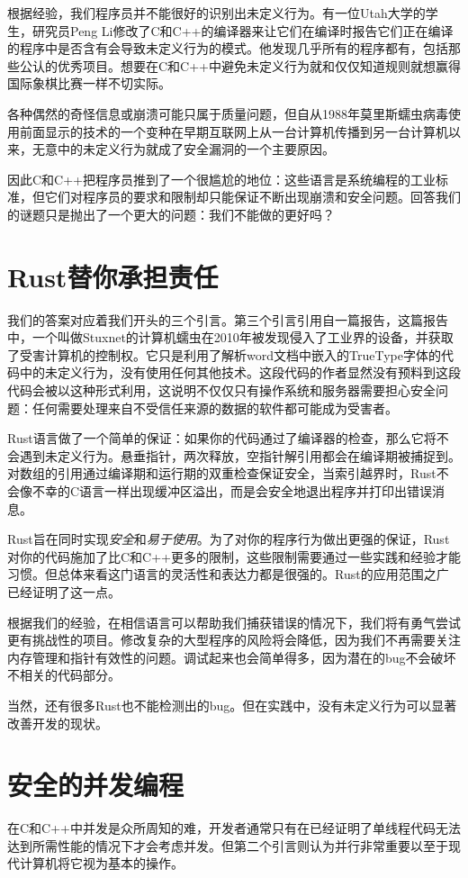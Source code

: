 根据经验，我们程序员并不能很好的识别出未定义行为。有一位Utah大学的学生，研究员Peng Li修改了C和C++的编译器来让它们在编译时报告它们正在编译的程序中是否含有会导致未定义行为的模式。他发现几乎所有的程序都有，包括那些公认的优秀项目。想要在C和C++中避免未定义行为就和仅仅知道规则就想赢得国际象棋比赛一样不切实际。

各种偶然的奇怪信息或崩溃可能只属于质量问题，但自从1988年莫里斯蠕虫病毒使用前面显示的技术的一个变种在早期互联网上从一台计算机传播到另一台计算机以来，无意中的未定义行为就成了安全漏洞的一个主要原因。

因此C和C++把程序员推到了一个很尴尬的地位：这些语言是系统编程的工业标准，但它们对程序员的要求和限制却只能保证不断出现崩溃和安全问题。回答我们的谜题只是抛出了一个更大的问题：我们不能做的更好吗？

\section{Rust替你承担责任}
我们的答案对应着我们开头的三个引言。第三个引言引用自一篇报告，这篇报告中，一个叫做Stuxnet的计算机蠕虫在2010年被发现侵入了工业界的设备，并获取了受害计算机的控制权。它只是利用了解析word文档中嵌入的TrueType字体的代码中的未定义行为，没有使用任何其他技术。这段代码的作者显然没有预料到这段代码会被以这种形式利用，这说明不仅仅只有操作系统和服务器需要担心安全问题：任何需要处理来自不受信任来源的数据的软件都可能成为受害者。

Rust语言做了一个简单的保证：如果你的代码通过了编译器的检查，那么它将不会遇到未定义行为。悬垂指针，两次释放，空指针解引用都会在编译期被捕捉到。对数组的引用通过编译期和运行期的双重检查保证安全，当索引越界时，Rust不会像不幸的C语言一样出现缓冲区溢出，而是会安全地退出程序并打印出错误消息。

Rust旨在同时实现\emph{安全}和\emph{易于使用}。为了对你的程序行为做出更强的保证，Rust对你的代码施加了比C和C++更多的限制，这些限制需要通过一些实践和经验才能习惯。但总体来看这门语言的灵活性和表达力都是很强的。Rust的应用范围之广已经证明了这一点。

根据我们的经验，在相信语言可以帮助我们捕获错误的情况下，我们将有勇气尝试更有挑战性的项目。修改复杂的大型程序的风险将会降低，因为我们不再需要关注内存管理和指针有效性的问题。调试起来也会简单得多，因为潜在的bug不会破坏不相关的代码部分。

当然，还有很多Rust也不能检测出的bug。但在实践中，没有未定义行为可以显著改善开发的现状。

\section{安全的并发编程}
在C和C++中并发是众所周知的难，开发者通常只有在已经证明了单线程代码无法达到所需性能的情况下才会考虑并发。但第二个引言则认为并行非常重要以至于现代计算机将它视为基本的操作。

